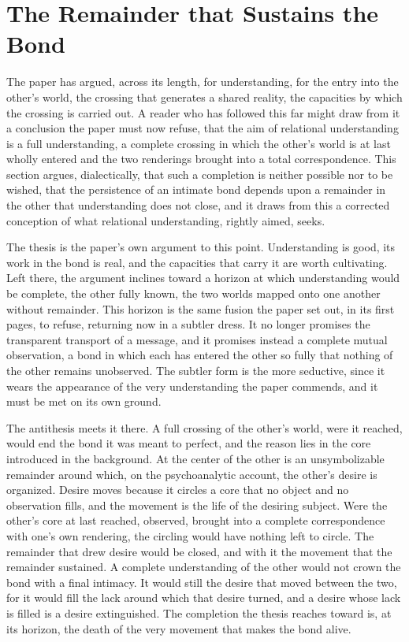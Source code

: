 \section{The Remainder that Sustains the Bond}
\label{p27:sec:remainder}

\noindent
The paper has argued, across its length, for understanding, for the entry into the other's world, the crossing that generates a shared reality, the capacities by which the crossing is carried out. A reader who has followed this far might draw from it a conclusion the paper must now refuse, that the aim of relational understanding is a full understanding, a complete crossing in which the other's world is at last wholly entered and the two renderings brought into a total correspondence. This section argues, dialectically, that such a completion is neither possible nor to be wished, that the persistence of an intimate bond depends upon a remainder in the other that understanding does not close, and it draws from this a corrected conception of what relational understanding, rightly aimed, seeks.

The thesis is the paper's own argument to this point. Understanding is good, its work in the bond is real, and the capacities that carry it are worth cultivating. Left there, the argument inclines toward a horizon at which understanding would be complete, the other fully known, the two worlds mapped onto one another without remainder. This horizon is the same fusion the paper set out, in its first pages, to refuse, returning now in a subtler dress. It no longer promises the transparent transport of a message, and it promises instead a complete mutual observation, a bond in which each has entered the other so fully that nothing of the other remains unobserved. The subtler form is the more seductive, since it wears the appearance of the very understanding the paper commends, and it must be met on its own ground.

The antithesis meets it there. A full crossing of the other's world, were it reached, would end the bond it was meant to perfect, and the reason lies in the core introduced in the background. At the center of the other is an unsymbolizable remainder around which, on the psychoanalytic account, the other's desire is organized. Desire moves because it circles a core that no object and no observation fills, and the movement is the life of the desiring subject. Were the other's core at last reached, observed, brought into a complete correspondence with one's own rendering, the circling would have nothing left to circle. The remainder that drew desire would be closed, and with it the movement that the remainder sustained. A complete understanding of the other would not crown the bond with a final intimacy. It would still the desire that moved between the two, for it would fill the lack around which that desire turned, and a desire whose lack is filled is a desire extinguished. The completion the thesis reaches toward is, at its horizon, the death of the very movement that makes the bond alive.

